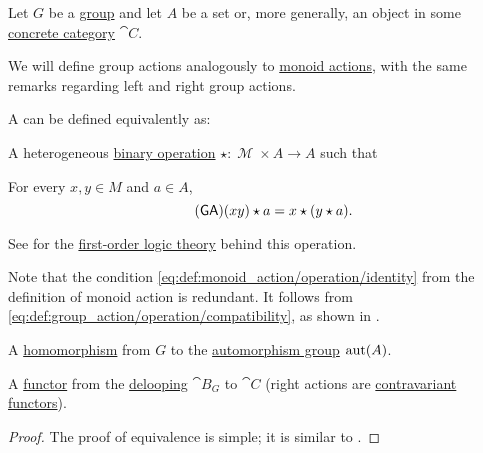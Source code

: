 \begin{definition}\label{def:group_action}
  Let \( G \) be a \hyperref[def:group]{group} and let \( A \) be a set or, more generally, an object in some \hyperref[def:concrete_category]{concrete category} \( \cat{C} \).

  We will define group actions analogously to \hyperref[def:monoid_action]{monoid actions}, with the same remarks regarding left and right group actions.

  A  can be defined equivalently as:
  \begin{thmenum}
     A heterogeneous \hyperref[def:magma]{binary operation} \( \star: \mscrM \times A \to A \) such that
    \begin{thmenum}
       For every \( x, y \in M \) and \( a \in A \),
      \begin{equation}\label{eq:def:group_action/operation/compatibility}\tag{\logic{GA}}
        (xy) \star a = x \star (y \star a).
      \end{equation}
    \end{thmenum}

    See  for the \hyperref[def:first_order_theory]{first-order logic theory} behind this operation.

    Note that the condition \eqref{eq:def:monoid_action/operation/identity} from the definition of monoid action is redundant. It follows from \eqref{eq:def:group_action/operation/compatibility}, as shown in .

     A \hyperref[def:group/homomorphism]{homomorphism} from \( G \) to the \hyperref[def:automorphism_group]{automorphism group} \( \operatorname{aut}(A) \).

     A \hyperref[def:functor]{functor} from the \hyperref[def:monoid_delooping]{delooping} \( \cat{B}_G \) to \( \cat{C} \) (right actions are \hyperref[rem:contravariant_functor]{contravariant functors}).
  \end{thmenum}
\end{definition}
\begin{proof}
  The proof of equivalence is simple; it is similar to .
\end{proof}

